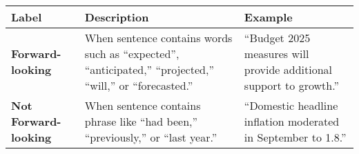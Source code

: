 \begin{table*}
    \caption{} \vspace{1em}
    \begin{tabular}{p{}p{}p{}}
    \toprule
    \textbf{Label} & \textbf{Description} & \textbf{Example} \\
    \midrule
    \textbf{Forward-looking} & When sentence contains words such as “expected”, “anticipated,” “projected,” “will,” or “forecasted.” & “Budget 2025 measures will provide additional support to growth.” \\
    \midrule
    \textbf{Not Forward-looking} & When sentence contains phrase like “had been,” “previously,” or “last year.” & “Domestic headline inflation moderated in September to 1.8.” \\
    \bottomrule
    \end{tabular}
    \label{tb:bok_forward_looking_guide}
\end{table*}